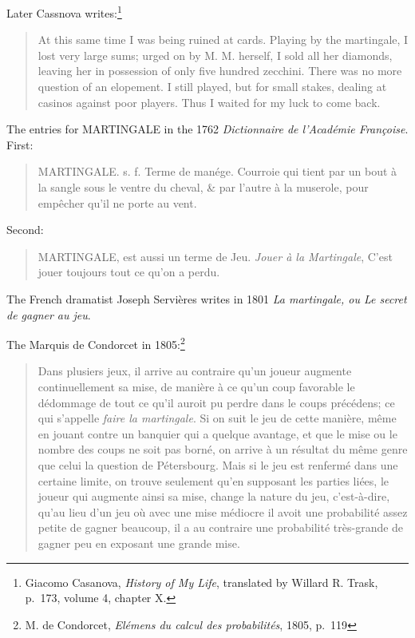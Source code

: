\documentclass{article}
\begin{document}
Later Cassnova writes:\footnote{Giacomo Casanova, {\em History of My Life},
translated by Willard R. Trask, p.~173, volume 4, chapter X.}

\begin{quote}
At this same time I was being ruined at cards. Playing by the martingale, I lost very large sums; urged
on by M. M. herself, I sold all her diamonds, leaving her in possession of only five hundred
zecchini. There was no more question of an elopement. I still played, but for small
stakes, dealing at casinos against poor players. Thus I waited for my luck to come back.
\end{quote}

The entries for MARTINGALE in the 1762 {\em Dictionnaire de l'Acad\'emie Fran\c{c}oise}. First:
\begin{quote}
MARTINGALE. s. f. Terme de man\'ege. Courroie qui tient par un bout \`a la sangle sous le ventre du cheval, \& 
par l'autre \`a la muserole, pour emp\^echer qu'il ne porte au vent.
\end{quote}
Second:
\begin{quote}
MARTINGALE, est aussi un terme de Jeu. {\em Jouer \`a la Martingale}, C'est jouer toujours tout ce 
qu'on a perdu.
\end{quote}

The French dramatist Joseph Servi\`eres writes in 1801 
{\em La martingale, ou Le secret de gagner au jeu}.

The Marquis de Condorcet in 1805:\footnote{M. de Condorcet, {\em El\'emens du calcul des probabilit\'es},
1805, p.~119}
\begin{quote}
Dans plusiers jeux, il arrive au contraire qu'un joueur augmente continuellement sa mise,
de mani\`ere \`a ce qu'un coup favorable le d\'edommage de tout ce qu'il auroit pu perdre dans le
coups pr\'ec\'edens; ce qui s'appelle {\em faire la martingale}. Si on suit le jeu de cette mani\`ere, m\^eme
en jouant contre un banquier qui a quelque avantage, et que le mise ou le nombre des coups
ne soit pas born\'e, on arrive \`a un r\'esultat du m\^eme genre que celui la question de P\'etersbourg. Mais
si le jeu est renferm\'e dans une certaine limite, on trouve seulement qu'en supposant les parties
li\'ees, le joueur qui augmente ainsi sa mise, change la nature du jeu, c'est-\`a-dire, qu'au 
lieu d'un jeu o\`u avec une mise m\'ediocre il avoit une probabilit\'e assez petite de gagner beaucoup,
il a au contraire une probabilit\'e tr\`es-grande de gagner peu en exposant une grande mise.
\end{quote}
\end{document}
